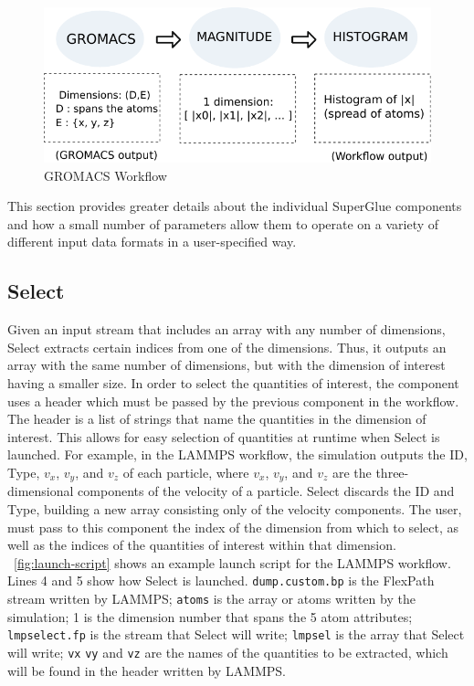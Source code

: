 \begin{figure}
  \center
  \includegraphics[width=\columnwidth]{fig/wflow_gromacs}
  \vspace{-0.25in}
  \caption{GROMACS Workflow}
  \label{fig:gromacs-workflow}
  \vspace{-0.15in}
\end{figure}



This section provides greater details about the individual SuperGlue components
and how a small number of
parameters allow them to operate on a variety
of different input data formats in
a user-specified way.

\subsection{Select}

Given an input stream that includes an array with
any number of dimensions,
Select extracts certain indices from one of
the dimensions. Thus, it outputs an array
with the same number of dimensions,
but with the dimension of interest having a
smaller size. In order to select the quantities of
interest, the component uses a header which
must be passed by the previous component in the
workflow. The header is a list of strings that
name the quantities in the
dimension of interest. This allows for easy
selection of quantities at runtime when
Select is launched. For example, in the LAMMPS workflow,
the simulation outputs the ID, Type, $v_{x}$, $v_y$, and $v_z$
of each particle, where $v_{x}$, $v_y$, and $v_z$ are the
three-dimensional components of the velocity of a particle.
Select discards the ID and Type, building a new
array consisting only of the velocity components.
The user, must pass to
this component the index of the dimension
from which to select, as well as the
indices of the quantities of interest within that dimension.
~\autoref{fig:launch-script} shows an example launch
script for the LAMMPS workflow. Lines 4 and 5
show how Select is launched. \verb|dump.custom.bp|
is the FlexPath stream written by LAMMPS; \verb|atoms|
is the array or atoms written by the simulation; 
1 is the dimension number that spans the 5 atom attributes;
\verb|lmpselect.fp| is the stream that Select will write;
\verb|lmpsel| is the array that Select will write;
\verb|vx| \verb|vy| and \verb|vz| are the
names of the quantities
to be extracted, which will be found in the
header written by LAMMPS.

